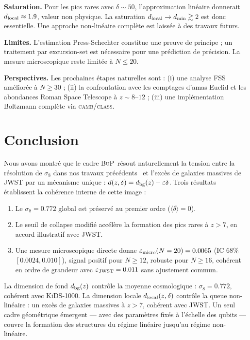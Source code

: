 \documentclass[11pt]{article}
\newcommand{\sig}{\sigma_8}
\newcommand{\BuP}{\textsc{BuP}}
\newcommand{\camb}{\textsc{camb}}
\begin{document}
\noindent\textbf{Saturation.}
Pour les pics rares avec $\delta \sim 50$, l'approximation linéaire
donnerait $d_{\rm local} \approx 1.9$, valeur non physique.
La saturation $d_{\rm local} \to d_{\min} \gtrsim 2$ est donc essentielle.
Une approche non-linéaire complète est laissée à des travaux futurs.

\noindent\textbf{Limites.}
L'estimation Press-Schechter constitue une preuve de principe ; un
traitement par excursion-set est nécessaire pour une prédiction de
précision. La mesure microscopique reste limitée à $N \le 20$.

\noindent\textbf{Perspectives.}
Les prochaines étapes naturelles sont :
(i) une analyse FSS améliorée à $N \ge 30$ ;
(ii) la confrontation avec les comptages d'amas Euclid et les
abondances Roman Space Telescope à $z \sim 8$--$12$ ;
(iii) une implémentation Boltzmann complète via \camb/\textsc{class}.

\section{Conclusion}

Nous avons montré que le cadre \BuP\ résout naturellement la tension
entre la résolution de $\sig$ dans nos travaux précédents~\cite{hamdad2026bup}
et l'excès de galaxies massives de JWST par un mécanisme unique :
$d(z,\delta) = d_{\rm bg}(z) - \varepsilon\delta$.
Trois résultats établissent la cohérence interne de cette image :

\begin{enumerate}
  \item Le $\sig = 0.772$ global est préservé au premier ordre ($\langle\delta\rangle = 0$).
  \item Le seuil de collapse modifié accélère la formation des pics rares à $z>7$,
        en accord illustratif avec JWST.
  \item Une mesure microscopique directe donne $\varepsilon_{\rm micro}(N=20) = 0.0065$
        (IC 68\% $[0.0024, 0.010]$), signal positif pour $N \ge 12$, robuste
        pour $N \ge 16$, cohérent en ordre de grandeur avec
        $\varepsilon_{\rm JWST} = 0.011$ sans ajustement commun.
\end{enumerate}

La dimension de fond $d_{\rm bg}(z)$ contrôle la moyenne cosmologique :
$\sig = 0.772$, cohérent avec KiDS-1000.
La dimension locale $d_{\rm local}(z,\delta)$ contrôle la queue non-linéaire :
un excès de galaxies massives à $z>7$, cohérent avec JWST.
Un seul cadre géométrique émergent --- avec des paramètres fixés à
l'échelle des qubits --- couvre la formation des structures du régime
linéaire jusqu'au régime non-linéaire.
\end{document}
